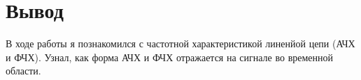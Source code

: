 \chapter{Вывод}
\label{ch:сhap5}

В ходе работы я познакомился с частотной характеристикой линенйой цепи (АЧХ и ФЧХ). Узнал, как форма АЧХ и ФЧХ отражается на
сигнале во временной области.


\endinput
